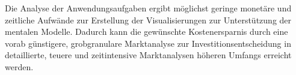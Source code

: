 \documentclass[usegeometry=true]{scrartcl}
\begin{document}
Die Analyse der Anwendungsaufgaben ergibt möglichst geringe monetäre und zeitliche Aufwände zur Erstellung der Visualisierungen 
zur Unterstützung der mentalen Modelle.
Dadurch kann die gewünschte Kostenersparnis durch eine vorab günstigere, grobgranulare Marktanalyse zur Investitionsentscheidung in 
detaillierte, teuere und zeitintensive Marktanalysen höheren Umfangs erreicht werden.


\end{document}

